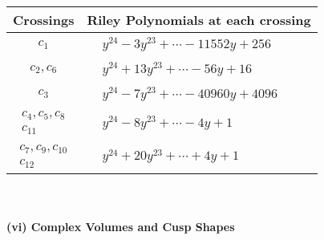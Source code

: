\documentclass[1p]{elsarticle_modified}
\theoremstyle{definition}
\begin{document}
\begin{tabular}{m{50pt}|m{274pt}}
Crossings & \hspace{64pt}Riley Polynomials at each crossing \\
\hline $$\begin{aligned}c_{1}\end{aligned}$$&$\begin{aligned}
&y^{24}-3 y^{23}+\cdots-11552 y+256
\end{aligned}$\\
\hline $$\begin{aligned}c_{2},c_{6}\end{aligned}$$&$\begin{aligned}
&y^{24}+13 y^{23}+\cdots-56 y+16
\end{aligned}$\\
\hline $$\begin{aligned}c_{3}\end{aligned}$$&$\begin{aligned}
&y^{24}-7 y^{23}+\cdots-40960 y+4096
\end{aligned}$\\
\hline $$\begin{aligned}c_{4},c_{5},c_{8}\\c_{11}\end{aligned}$$&$\begin{aligned}
&y^{24}-8 y^{23}+\cdots-4 y+1
\end{aligned}$\\
\hline $$\begin{aligned}c_{7},c_{9},c_{10}\\c_{12}\end{aligned}$$&$\begin{aligned}
&y^{24}+20 y^{23}+\cdots+4 y+1
\end{aligned}$\\
\hline
\end{tabular}\\~\\
\newpage\flushleft \textbf{(vi) Complex Volumes and Cusp Shapes}
\end{document}
